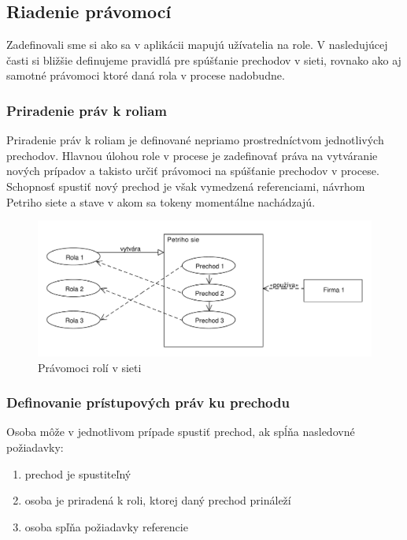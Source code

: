 	
	\subsection{Riadenie právomocí}	
	Zadefinovali sme si ako sa v aplikácii mapujú užívatelia na role. V nasledujúcej časti si bližšie definujeme pravidlá pre spúšťanie prechodov v sieti, rovnako ako aj samotné právomoci ktoré daná rola v procese nadobudne. 
	


	\subsubsection{Priradenie práv k roliam}
	Priradenie práv k roliam je definované nepriamo prostredníctvom jednotlivých prechodov. Hlavnou úlohou role v procese je zadefinovať práva na vytváranie nových prípadov a takisto určiť právomoci na spúšťanie prechodov v procese. Schopnosť spustiť nový prechod je však vymedzená referenciami, návrhom Petriho siete a stave v akom sa tokeny momentálne nachádzajú.  

	
		\begin{figure}[h]
			\centering
			\includegraphics[width=0.9\linewidth]{images/roles_permissions}
			\caption{ Právomoci rolí v sieti }
			\label{fig:roles_permissions}
		\end{figure}
		
	\subsubsection{Definovanie prístupových práv ku prechodu}

	Osoba môže v jednotlivom prípade spustiť prechod, ak spĺňa nasledovné požiadavky:
	\begin{enumerate}
		\item prechod je spustiteľný
		\item osoba je priradená k roli, ktorej daný prechod prináleží
		\item osoba spľňa požiadavky referencie
	\end{enumerate}
	
